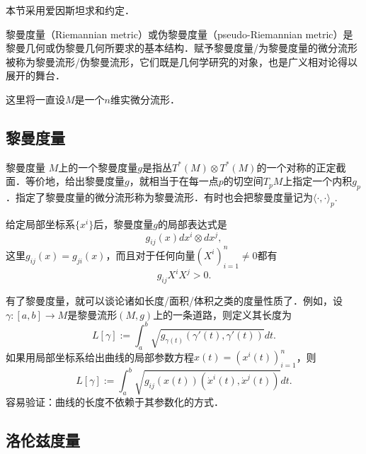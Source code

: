 
本节采用爱因斯坦求和约定．

黎曼度量（Riemannian metric）或伪黎曼度量（pseudo-Riemannian metric）是黎曼几何或伪黎曼几何所要求的基本结构．赋予黎曼度量/为黎曼度量的微分流形被称为黎曼流形/伪黎曼流形，它们既是几何学研究的对象，也是广义相对论得以展开的舞台．

这里将一直设$M$是一个$n$维实微分流形．

\subsection{黎曼度量}
\begin{definition}{黎曼度量}
$M$上的一个黎曼度量$g$是指丛$T^*(M)\otimes T^*(M)$的一个对称的正定截面．等价地，给出黎曼度量$g$，就相当于在每一点$p$的切空间$T_pM$上指定一个内积$g_p$．指定了黎曼度量的微分流形称为黎曼流形．有时也会把黎曼度量记为$\langle\cdot,\cdot\rangle_p$.
\end{definition}
给定局部坐标系$\{x^i\}$后，黎曼度量$g$的局部表达式是
$$
g_{ij}(x)dx^i\otimes dx^j,
$$
这里$g_{ij}(x)=g_{ji}(x)$，而且对于任何向量$(X^i)_{i=1}^n\neq0$都有
$$
g_{ij}X^iX^j>0.
$$

有了黎曼度量，就可以谈论诸如长度/面积/体积之类的度量性质了．例如，设$\gamma:[a,b]\to M$是黎曼流形$(M,g)$上的一条道路，则定义其长度为
$$
L[\gamma]:=\int_{a}^b \sqrt{g_{\gamma(t)}(\gamma'(t),\gamma'(t))}dt.
$$
如果用局部坐标系给出曲线的局部参数方程$x(t)=(x^i(t))_{i=1}^n$，则
$$
L[\gamma]:=\int_{a}^b \sqrt{g_{ij}(x(t))(\dot x^i(t),\dot x^j(t))}dt.
$$
容易验证：曲线的长度不依赖于其参数化的方式．



\subsection{洛伦兹度量}